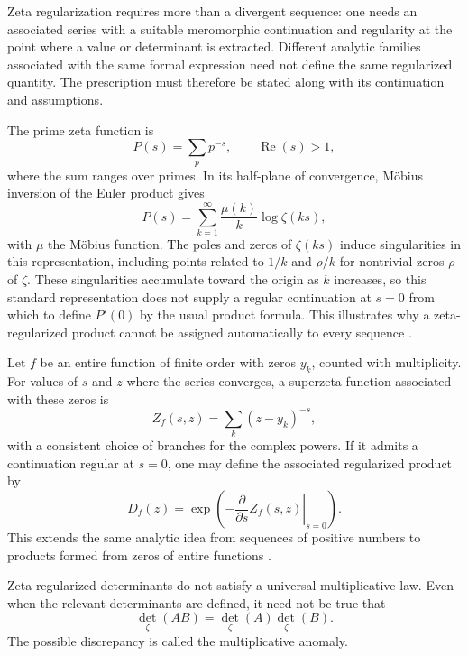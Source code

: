 Zeta regularization requires more than a divergent sequence: one needs an associated series with a suitable meromorphic continuation and regularity at the point where a value or determinant is extracted. Different analytic families associated with the same formal expression need not define the same regularized quantity. The prescription must therefore be stated along with its continuation and assumptions.

\begin{example}
The prime zeta function is
\[
 P(s)=\sum_{p}p^{-s},\qquad \operatorname{Re}(s)>1,
\]
where the sum ranges over primes. In its half-plane of convergence, Möbius inversion of the Euler product gives
\[
 P(s)=\sum_{k=1}^{\infty}\frac{\mu(k)}{k}\log\zeta(ks),
\]
with $\mu$ the Möbius function. The poles and zeros of $\zeta(ks)$ induce singularities in this representation, including points related to $1/k$ and $\rho/k$ for nontrivial zeros $\rho$ of $\zeta$. These singularities accumulate toward the origin as $k$ increases, so this standard representation does not supply a regular continuation at $s=0$ from which to define $P'(0)$ by the usual product formula. This illustrates why a zeta-regularized product cannot be assigned automatically to every sequence \cite{SotoVillada2026ZR}.
\end{example}

\begin{definition}
Let $f$ be an entire function of finite order with zeros $y_k$, counted with multiplicity. For values of $s$ and $z$ where the series converges, a superzeta function associated with these zeros is
\[
 Z_f(s,z)=\sum_k(z-y_k)^{-s},
\]
with a consistent choice of branches for the complex powers. If it admits a continuation regular at $s=0$, one may define the associated regularized product by
\[
 D_f(z)=\exp\!\left(-\left.\frac{\partial}{\partial s}Z_f(s,z)\right|_{s=0}\right).
\]
This extends the same analytic idea from sequences of positive numbers to products formed from zeros of entire functions \cite{SotoVillada2026ZR}.
\end{definition}

\begin{proposition}
Zeta-regularized determinants do not satisfy a universal multiplicative law. Even when the relevant determinants are defined, it need not be true that
\[
 \det_{\zeta}(AB)=\det_{\zeta}(A)\det_{\zeta}(B).
\]
The possible discrepancy is called the multiplicative anomaly.
\end{proposition}

